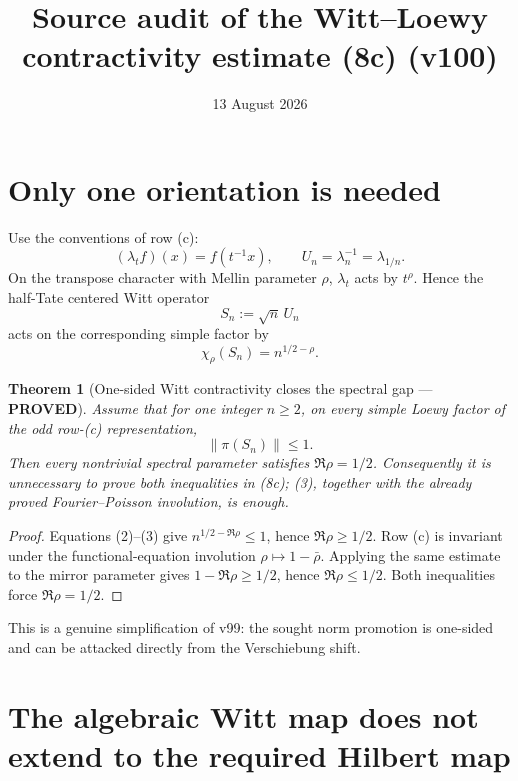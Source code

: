 \documentclass[11pt]{article}
\title{Source audit of the Witt--Loewy contractivity estimate (8c) (v100)}
\date{13 August 2026}
\newcommand{\PROVED}{\textcolor{green!40!black}{\textbf{PROVED}}}
\newtheorem{theorem}{Theorem}
\begin{document}
\maketitle

\section{Only one orientation is needed}

Use the conventions of row (c):
\[
 (\lambda_t f)(x)=f(t^{-1}x),\qquad
 U_n=\lambda_n^{-1}=\lambda_{1/n}.
\]
On the transpose character with Mellin parameter $\rho$, $\lambda_t$ acts
by $t^\rho$.  Hence the half-Tate centered Witt operator
\begin{equation}
                    S_n:=\sqrt n\,U_n                \tag{1}
\end{equation}
acts on the corresponding simple factor by
\begin{equation}
                    \chi_\rho(S_n)=n^{1/2-\rho}.     \tag{2}
\end{equation}

\begin{theorem}[One-sided Witt contractivity closes the spectral gap ---
\PROVED]
Assume that for one integer $n\ge2$, on every simple Loewy factor of the
odd row-(c) representation,
\begin{equation}
                         \|\pi(S_n)\|\le1.           \tag{3}
\end{equation}
Then every nontrivial spectral parameter satisfies
$\Re\rho=1/2$.  Consequently it is unnecessary to prove both inequalities
in (8c); (3), together with the already proved Fourier--Poisson involution,
is enough.
\end{theorem}

\begin{proof}
Equations (2)--(3) give
$n^{1/2-\Re\rho}\le1$, hence $\Re\rho\ge1/2$.  Row (c) is invariant under
the functional-equation involution $\rho\mapsto1-\bar\rho$.  Applying the
same estimate to the mirror parameter gives
$1-\Re\rho\ge1/2$, hence $\Re\rho\le1/2$.  Both inequalities force
$\Re\rho=1/2$.
\end{proof}

This is a genuine simplification of v99: the sought norm promotion is
one-sided and can be attacked directly from the Verschiebung shift.

\section{The algebraic Witt map does not extend to the required Hilbert map}
\end{document}
